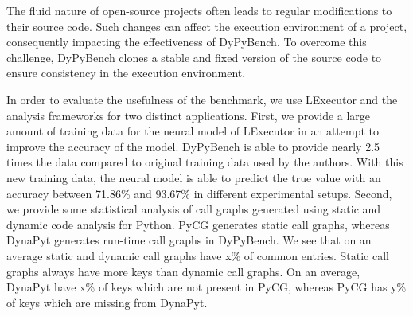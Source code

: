 The fluid nature of open-source projects often leads to regular modifications to their source code.
Such changes can affect the execution environment of a project, consequently impacting the effectiveness of DyPyBench.
To overcome this challenge, DyPyBench clones a stable and fixed version of the source code to ensure consistency in the execution environment.

In order to evaluate the usefulness of the benchmark, we use LExecutor and the analysis frameworks for two distinct applications.
First, we provide a large amount of training data for the neural model of LExecutor in an attempt to improve the accuracy of the model.
DyPyBench is able to provide nearly 2.5 times the data compared to original training data used by the authors.
With this new training data, the neural model is able to predict the true value with an accuracy between 71.86\% and 93.67\% in different experimental setups.
Second, we provide some statistical analysis of call graphs generated using static and dynamic code analysis for Python.
PyCG generates static call graphs, whereas DynaPyt generates run-time call graphs in DyPyBench.
We see that on an average static and dynamic call graphs have x\% of common entries.
Static call graphs always have more keys than dynamic call graphs.
On an average, DynaPyt have x\% of keys which are not present in PyCG, whereas PyCG has y\% of keys which are missing from DynaPyt.




